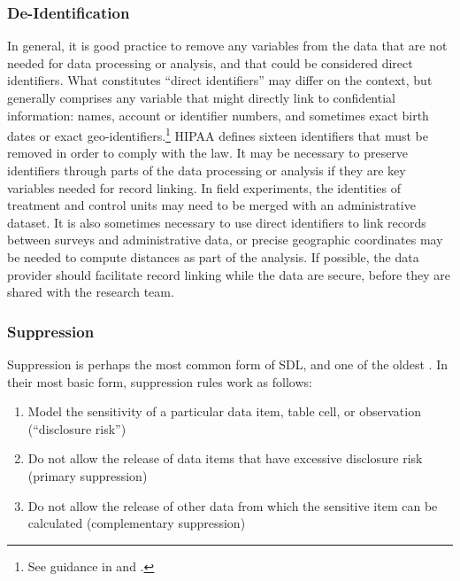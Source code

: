 \documentclass[
]{WileySix}
\providecommand{\tightlist}{%
  \setlength{\itemsep}{0pt}\setlength{\parskip}{0pt}}
\begin{document}
\hypertarget{de-identification}{%
\subsubsection{De-Identification}\label{de-identification}}

In general, it is good practice to remove any variables from the data that are not needed for data processing or analysis, and that could be considered direct identifiers. What constitutes ``direct identifiers'' may differ on the context, but generally comprises any variable that might directly link to confidential information: names, account or identifier numbers, and sometimes exact birth dates or exact geo-identifiers.\footnote{See guidance in \citet{world_bank_dime_nodate} and \citet{kopper_j-pal_2020}.} HIPAA defines sixteen identifiers that must be removed in order to comply with the law. It may be necessary to preserve identifiers through parts of the data processing or analysis if they are key variables needed for record linking. In field experiments, the identities of treatment and control units may need to be merged with an administrative dataset. It is also sometimes necessary to use direct identifiers to link records between surveys and administrative data, or precise geographic coordinates may be needed to compute distances as part of the analysis. If possible, the data provider should facilitate record linking while the data are secure, before they are shared with the research team.

\hypertarget{suppression}{%
\subsubsection{Suppression}\label{suppression}}

Suppression is perhaps the most common form of SDL, and one of the oldest \citep{fellegi_question_1972}. In their most basic form, suppression rules work as follows:

\begin{enumerate}
\def\labelenumi{\arabic{enumi}.}
\tightlist
\item
  Model the sensitivity of a particular data item, table cell, or observation (``disclosure risk'')
\item
  Do not allow the release of data items that have excessive disclosure risk (primary suppression)
\item
  Do not allow the release of other data from which the sensitive item can be calculated (complementary suppression)
\end{enumerate}
\end{document}
